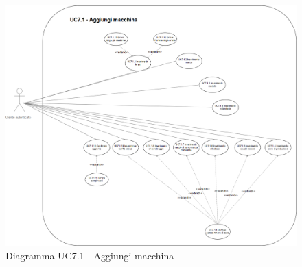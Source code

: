            \begin{figure}[h!]
           \begin{center}
           \includegraphics[scale=0.3]{immagini/71.png}   
           \caption{Diagramma UC7.1 - Aggiungi macchina}
           \end{center}
           \end{figure}      
           
           \newpage      
                       
                     
